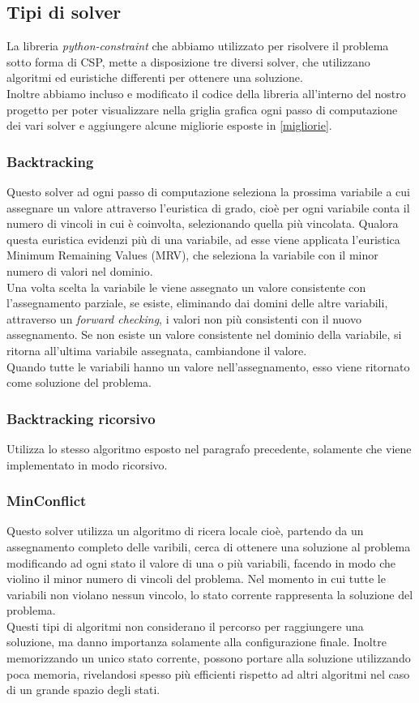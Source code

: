 \subsection{Tipi di solver}
La libreria \textit{python-constraint} che abbiamo utilizzato per risolvere il problema sotto forma di CSP, mette a disposizione tre diversi solver, che utilizzano algoritmi ed euristiche differenti per ottenere una soluzione. \\
Inoltre abbiamo incluso e modificato il codice della libreria all'interno del nostro progetto per poter visualizzare nella griglia grafica ogni passo di computazione dei vari solver e aggiungere alcune migliorie esposte in \ref{migliorie}.

\subsubsection{Backtracking}
Questo solver ad ogni passo di computazione seleziona la prossima variabile a cui assegnare un valore attraverso l'euristica di grado, cioè per ogni variabile conta il numero di vincoli in cui è coinvolta, selezionando quella più vincolata. Qualora questa euristica evidenzi più di una variabile, ad esse viene applicata l'euristica Minimum Remaining Values (MRV), che seleziona la variabile con il minor numero di valori nel dominio.\\
Una volta scelta la variabile le viene assegnato un valore consistente con l'assegnamento parziale, se esiste, eliminando dai domini delle altre variabili, attraverso un \textit{forward checking}, i valori non più consistenti con il nuovo assegnamento. Se non esiste un valore consistente nel dominio della variabile, si ritorna all'ultima variabile assegnata, cambiandone il valore. \\
Quando tutte le variabili hanno un valore nell'assegnamento, esso viene ritornato come soluzione del problema.
\subsubsection{Backtracking ricorsivo}
Utilizza lo stesso algoritmo esposto nel paragrafo precedente, solamente che viene implementato in modo ricorsivo.
\subsubsection{MinConflict}
Questo solver utilizza un algoritmo di ricera locale cioè, partendo da un assegnamento completo delle varibili, cerca di ottenere una soluzione al problema modificando ad ogni stato il valore di una o più variabili, facendo in modo che violino il minor numero di vincoli del problema. Nel momento in cui tutte le variabili non violano nessun vincolo, lo stato corrente rappresenta la soluzione del problema.\\
Questi tipi di algoritmi non considerano il percorso per raggiungere una soluzione, ma danno importanza solamente alla configurazione finale. Inoltre memorizzando un unico stato corrente, possono portare alla soluzione utilizzando poca memoria, rivelandosi spesso più efficienti rispetto ad altri algoritmi nel caso di un grande spazio degli stati.

